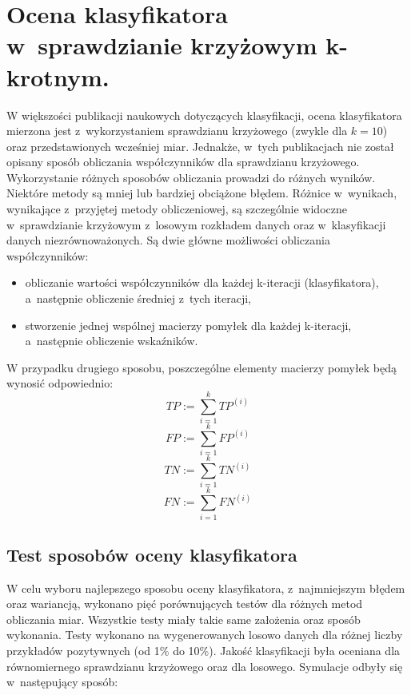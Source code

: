 \section{Ocena klasyfikatora w~sprawdzianie krzyżowym k-krotnym.}
W większości publikacji naukowych dotyczących klasyfikacji, ocena klasyfikatora mierzona jest z~wykorzystaniem sprawdzianu krzyżowego (zwykle dla $k=10$) oraz przedstawionych wcześniej miar. Jednakże, w~tych publikacjach nie został opisany sposób obliczania współczynników dla sprawdzianu krzyżowego. Wykorzystanie różnych sposobów obliczania prowadzi do różnych wyników. Niektóre metody są mniej lub bardziej obciążone błędem. Różnice w~wynikach, wynikające z~przyjętej metody obliczeniowej, są szczególnie widoczne w~sprawdzianie krzyżowym z~losowym rozkładem danych oraz w~klasyfikacji danych niezrównoważonych. Są dwie główne możliwości obliczania współczynników:
\begin{itemize}
	\item obliczanie wartości współczynników dla każdej k-iteracji (klasyfikatora), a~następnie obliczenie średniej z~tych iteracji,
	\item stworzenie jednej wspólnej macierzy pomyłek dla każdej k-iteracji, a~następnie obliczenie wskaźników.
\end{itemize}
W przypadku drugiego sposobu, poszczególne elementy macierzy pomyłek będą wynosić odpowiednio:
\[TP := \sum_{i=1}^{k} TP^{(i)}\]
\[FP := \sum_{i=1}^{k} FP^{(i)}\]
\[TN := \sum_{i=1}^{k} TN^{(i)}\]
\[FN := \sum_{i=1}^{k} FN^{(i)}\]
\subsection{Test sposobów oceny klasyfikatora}
W celu wyboru najlepszego sposobu oceny klasyfikatora, z~najmniejszym błędem oraz wariancją, wykonano pięć porównujących testów dla różnych metod obliczania miar. Wszystkie testy miały takie same założenia oraz sposób wykonania. Testy wykonano na wygenerowanych losowo danych dla różnej liczby przykładów pozytywnych (od 1\% do 10\%). Jakość klasyfikacji była oceniana dla równomiernego sprawdzianu krzyżowego oraz dla losowego. Symulacje odbyły się w~następujący sposób:

